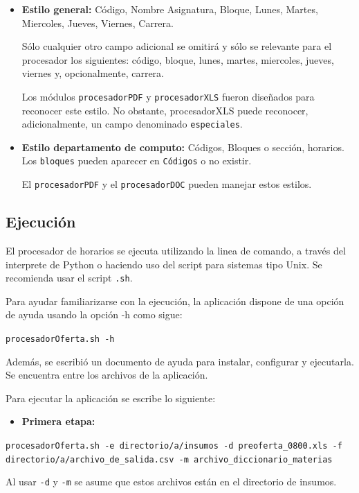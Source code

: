 \documentclass[]{article}
\begin{document}
\begin{itemize}
\item
  \textbf{Estilo general:} Código, Nombre Asignatura, Bloque, Lunes,
  Martes, Miercoles, Jueves, Viernes, Carrera.

  Sólo cualquier otro campo adicional se omitirá y sólo se relevante
  para el procesador los siguientes: código, bloque, lunes, martes,
  miercoles, jueves, viernes y, opcionalmente, carrera.

  Los módulos \texttt{procesadorPDF} y \texttt{procesadorXLS} fueron
  diseñados para reconocer este estilo. No obstante, procesadorXLS puede
  reconocer, adicionalmente, un campo denominado \texttt{especiales}.
\item
  \textbf{Estilo departamento de computo:} Códigos, Bloques o sección,
  horarios. Los \texttt{bloques} pueden aparecer en \texttt{Códigos} o
  no existir.

  El \texttt{procesadorPDF} y el \texttt{procesadorDOC} pueden manejar
  estos estilos.
\end{itemize}

\subsection{Ejecución}\label{ejecuciuxf3n}

El procesador de horarios se ejecuta utilizando la linea de comando, a
través del interprete de Python o haciendo uso del script para sistemas
tipo Unix. Se recomienda usar el script \texttt{.sh}.

Para ayudar familiarizarse con la ejecución, la aplicación dispone de
una opción de ayuda usando la opción -h como sigue:

\texttt{procesadorOferta.sh -h}

Además, se escribió un documento de ayuda para instalar, configurar y
ejecutarla. Se encuentra entre los archivos de la aplicación.

Para ejecutar la aplicación se escribe lo siguiente:

\begin{itemize}
\itemsep1pt\parskip0pt
\item
  \textbf{Primera etapa:}
\end{itemize}

\texttt{procesadorOferta.sh -e directorio/a/insumos -d preoferta\_0800.xls      -f directorio/a/archivo\_de\_salida.csv -m archivo\_diccionario\_materias}

Al usar \texttt{-d} y \texttt{-m} se asume que estos archivos están en
el directorio de insumos.
\end{document}
